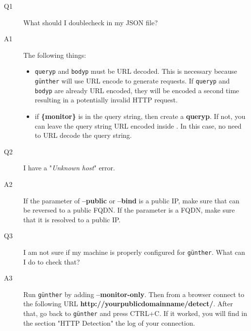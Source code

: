 \documentclass[10pt,a4paper]{article}
\newcommand{\g}{\texttt{g\"{u}nther}}
\begin{document}
\begin{description}

   \item[Q1] What should I doublecheck in my JSON file?

   \item[A1] The following things:

   \begin{itemize}

      \item \texttt{queryp} and \texttt{bodyp} must be URL decoded. This is
      necessary because \g{} will use URL encode to generate requests. If
      \texttt{queryp} and \texttt{bodyp} are already URL encoded, they will be
      encoded a second time resulting in a potentially invalid HTTP request.

	  \item if \textbf{\{monitor\}} is in the query string, then create a
	  \textbf{queryp}. If not, you can leave the query string URL encoded inside
	  . In this case, no need to URL decode the query string.
	  
   \end{itemize}

   \item[Q2] I have a "\emph{Unknown host}" error.
   
   \item[A2] If the parameter of \textbf{--public} or \textbf{--bind} is a
   public IP, make sure that can be reversed to a public FQDN. If the parameter
   is a FQDN, make sure that it is resolved to a public IP.

   \item[Q3] I am not sure if my machine is properly configured for \g{}. What
   can I do to check that?
   
  \item[A3] Run \g{} by adding \textbf{--monitor-only}. Then from a browser
   connect to the following URL \textbf{http://yourpublicdomainname/detect/}.
   After that, go back to \g{} and press CTRL+C. If it worked, you will find in
   the section "HTTP Detection" the log of your connection.

\end{description}
\end{document}
